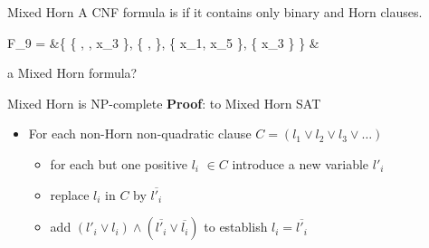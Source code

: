 \documentclass[t]{sdqbeamer}
\begin{document}
\begin{frame}{Mixed Horn}
	A CNF formula is  if it contains only binary and Horn clauses.
	\begin{example}
		\vspace*{-3ex}
		\begin{flalign*}
			F_9 = &\{ \{ , , x_3 \}, \{ ,  \}, \{ x_1, x_5 \}, \{ x_3 \} \} &
		\end{flalign*}
	\end{example}
	 a Mixed Horn formula? 
	\pause
	\begin{block}{Mixed Horn is NP-complete}
		\textbf{Proof}:  to Mixed Horn SAT
		\begin{itemize}\setlength{\itemsep}{1em}
			\item For each non-Horn non-quadratic clause $C=(l_1 \vee l_2 \vee l_3 \vee \dots)$
			\begin{itemize}\setlength{\itemsep}{1ex}
				\item for each but one positive $l_i$ $\in C$ introduce a new variable $l'_i$
				\item replace $l_i$ in $C$ by $\overline{l'_i}$
				\item add $(l'_i \vee l_i) \wedge (\overline{l'_i} \vee \overline{l_i})$ to establish $l_i = \overline{l'_i}$
			\end{itemize}
		\end{itemize}
	\end{block}
\end{frame}
\end{document}
